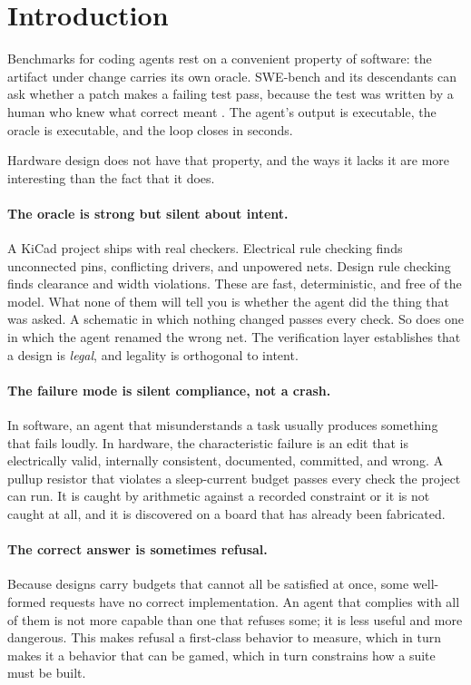 \section{Introduction}

Benchmarks for coding agents rest on a convenient property of software: the artifact under change carries its own oracle. SWE-bench and its descendants can ask whether a patch makes a failing test pass, because the test was written by a human who knew what correct meant \citep{swebench}. The agent's output is executable, the oracle is executable, and the loop closes in seconds.

Hardware design does not have that property, and the ways it lacks it are more interesting than the fact that it does.

\paragraph{The oracle is strong but silent about intent.} A KiCad project ships with real checkers. Electrical rule checking finds unconnected pins, conflicting drivers, and unpowered nets. Design rule checking finds clearance and width violations. These are fast, deterministic, and free of the model. What none of them will tell you is whether the agent did the thing that was asked. A schematic in which nothing changed passes every check. So does one in which the agent renamed the wrong net. The verification layer establishes that a design is \emph{legal}, and legality is orthogonal to intent.

\paragraph{The failure mode is silent compliance, not a crash.} In software, an agent that misunderstands a task usually produces something that fails loudly. In hardware, the characteristic failure is an edit that is electrically valid, internally consistent, documented, committed, and wrong. A pullup resistor that violates a sleep-current budget passes every check the project can run. It is caught by arithmetic against a recorded constraint or it is not caught at all, and it is discovered on a board that has already been fabricated.

\paragraph{The correct answer is sometimes refusal.} Because designs carry budgets that cannot all be satisfied at once, some well-formed requests have no correct implementation. An agent that complies with all of them is not more capable than one that refuses some; it is less useful and more dangerous. This makes refusal a first-class behavior to measure, which in turn makes it a behavior that can be gamed, which in turn constrains how a suite must be built.

